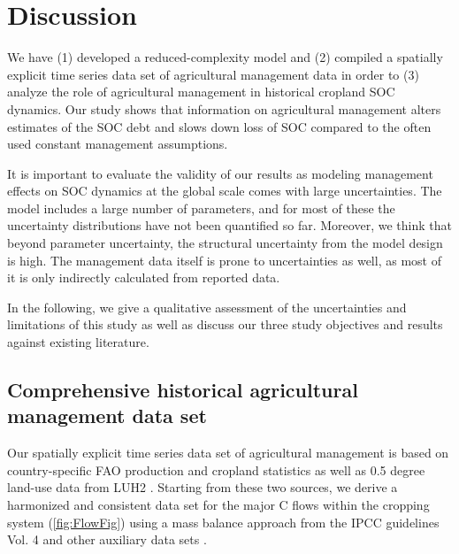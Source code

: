 \documentclass[gc, manuscript]{copernicus}
\begin{document}
\newpage

\hypertarget{discussion}{%
\section{Discussion}\label{discussion}}

We have (1) developed a reduced-complexity model and (2) compiled a spatially explicit time series data set of agricultural management data in order to (3) analyze the role of agricultural management in historical cropland SOC dynamics. Our study shows that information on agricultural management alters estimates of the SOC debt and slows down loss of SOC compared to the often used constant management assumptions.

It is important to evaluate the validity of our results as modeling management effects on SOC dynamics at the global scale comes with large uncertainties. The model includes a large number of parameters, and for most of these the uncertainty distributions have not been quantified so far. Moreover, we think that beyond parameter uncertainty, the structural uncertainty from the model design is high. The management data itself is prone to uncertainties as well, as most of it is only indirectly calculated from reported data.

In the following, we give a qualitative assessment of the uncertainties and limitations of this study as well as discuss our three study objectives and results against existing literature.

\hypertarget{comprehensive-historical-agricultural-management-data-set}{%
\subsection{Comprehensive historical agricultural management data set}\label{comprehensive-historical-agricultural-management-data-set}}

Our spatially explicit time series data set of agricultural management is based on country-specific FAO production and cropland statistics \citep{faostat_faostat_2016} as well as 0.5 degree land-use data from LUH2 \citep{hurtt_harmonization_2020}. Starting from these two sources, we derive a harmonized and consistent data set for the major C flows within the cropping system (\ref{fig:FlowFig}) using a mass balance approach from the IPCC guidelines Vol. 4 \citep{eggleston_ipcc_2006, calvo_buendia_ipcc_2019} and other auxiliary data sets \citep[e.g.][]{porwollik_generating_2019}.
\end{document}
